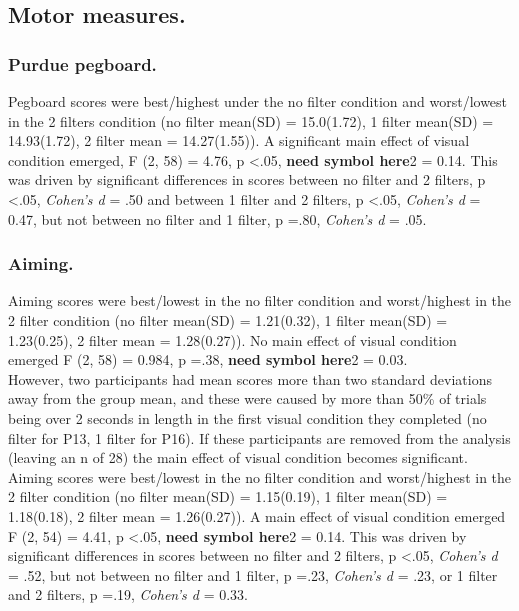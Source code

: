 \documentclass[
  english,
  man,floatsintext]{apa6}
\begin{document}
\hypertarget{motor-measures.}{%
\subsection{Motor measures.}\label{motor-measures.}}

\hypertarget{purdue-pegboard.}{%
\subsubsection{Purdue pegboard.}\label{purdue-pegboard.}}

Pegboard scores were best/highest under the no filter condition and worst/lowest in the 2 filters condition (no filter mean(SD) = 15.0(1.72), 1 filter mean(SD) = 14.93(1.72), 2 filter mean = 14.27(1.55)).
A significant main effect of visual condition emerged, F (2, 58) = 4.76, p \textless{}.05, \textbf{need symbol here}2 = 0.14.
This was driven by significant differences in scores between no filter and 2 filters, p \textless{}.05, \emph{Cohen's d} = .50 and between 1 filter and 2 filters, p \textless{}.05, \emph{Cohen's d} = 0.47, but not between no filter and 1 filter, p =.80, \emph{Cohen's d} = .05.

\hypertarget{aiming.-1}{%
\subsubsection{Aiming.}\label{aiming.-1}}

Aiming scores were best/lowest in the no filter condition and worst/highest in the 2 filter condition (no filter mean(SD) = 1.21(0.32), 1 filter mean(SD) = 1.23(0.25), 2 filter mean = 1.28(0.27)).
No main effect of visual condition emerged F (2, 58) = 0.984, p =.38, \textbf{need symbol here}2 = 0.03.\\
However, two participants had mean scores more than two standard deviations away from the group mean, and these were caused by more than 50\% of trials being over 2 seconds in length in the first visual condition they completed (no filter for P13, 1 filter for P16).
If these participants are removed from the analysis (leaving an n of 28) the main effect of visual condition becomes significant.
Aiming scores were best/lowest in the no filter condition and worst/highest in the 2 filter condition (no filter mean(SD) = 1.15(0.19), 1 filter mean(SD) = 1.18(0.18), 2 filter mean = 1.26(0.27)).
A main effect of visual condition emerged F (2, 54) = 4.41, p \textless{}.05, \textbf{need symbol here}2 = 0.14. This was driven by significant differences in scores between no filter and 2 filters, p \textless{}.05, \emph{Cohen's d} = .52, but not between no filter and 1 filter, p =.23, \emph{Cohen's d} = .23, or 1 filter and 2 filters, p =.19, \emph{Cohen's d} = 0.33.
\end{document}
